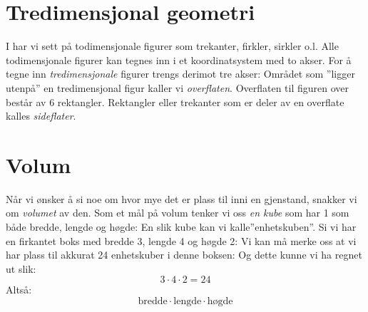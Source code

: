 \section{Tredimensjonal geometri}
I \mb\;har vi sett på todimensjonale figurer som trekanter, firkler, sirkler o.l. Alle todimensjonale figurer kan tegnes inn i et koordinatsystem med to akser.
For å tegne inn \textit{tredimensjonale} figurer trengs derimot tre akser:
Området som ''ligger utenpå'' en tredimensjonal figur kaller vi \textit{overflaten}. Overflaten til figuren over består av 6 rektangler. Rektangler eller trekanter som er deler av en overflate kalles \textit{sideflater}.


\section{Volum}
Når vi ønsker å si noe om hvor mye det er plass til inni en gjenstand, snakker vi om \textit{volumet} av den. Som et mål på volum tenker vi oss \textit{en kube} som har 1 som både bredde, lengde og høgde:
En slik kube kan vi kalle''enhetskuben''. Si vi har en firkantet boks med bredde 3, lengde 4 og høgde 2:
Vi kan må merke oss at vi har plass til akkurat 24 enhetskuber i denne boksen:
Og dette kunne vi ha regnet ut slik:
\[ 3\cdot 4\cdot 2=24\]
Altså:
\[\text{bredde}\cdot\text{lengde}\cdot\text{høgde} \]\vsk

